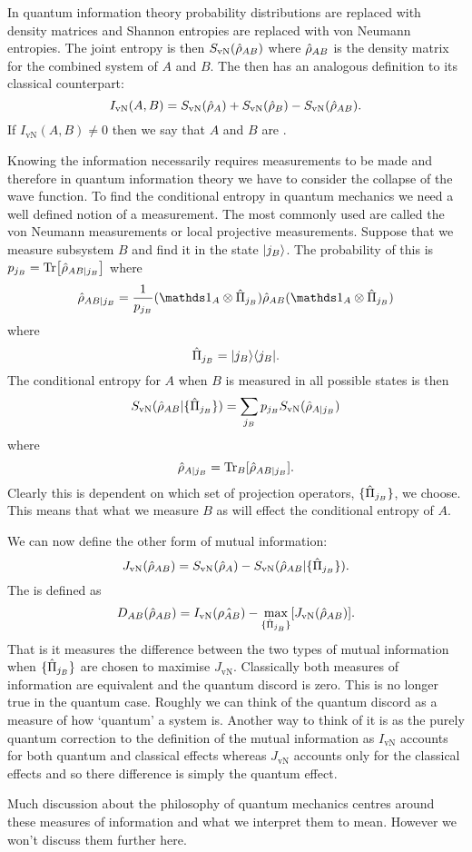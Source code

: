     In quantum information theory probability distributions are replaced with density matrices and Shannon entropies are replaced with von Neumann entropies.
    The joint entropy is then \(S_{\mathrm{vN}}(\hat{\rho}_{AB})\) where \(\hat{\rho}_{AB}\) is the density matrix for the combined system of \(A\) and \(B\).
    The  then has an analogous definition to its classical counterpart:
    \[I_{\mathrm{vN}}(A, B) = S_{\mathrm{vN}}(\hat{\rho}_A) + S_{\mathrm{vN}}(\hat{\rho}_B) - S_{\mathrm{vN}}(\hat{\rho}_{AB}).\]
    If \(I_{\mathrm{vN}}(A, B) \ne 0\) then we say that \(A\) and \(B\) are .
    
    Knowing the information necessarily requires measurements to be made and therefore in quantum information theory we have to consider the collapse of the wave function.
    To find the conditional entropy in quantum mechanics we need a well defined notion of a measurement.
    The most commonly used are called the von Neumann measurements or local projective measurements.
    Suppose that we measure subsystem \(B\) and find it in the state \(\vert {j_B} \rangle\).
    The probability of this is \(p_{j_B} = \Tr[\hat{\rho}_{AB|j_B}]\) where
    \[\operator{\rho}_{AB|j_B} = \frac{1}{p_{j_B}}(\ident_A\tensorProd \operator{\Pi}_{j_B})\operator{\rho}_{AB}(\ident_A\tensorProd\operator{\Pi}_{j_B})\]
    where
    \[\hat{\Pi}_{j_B} = \vert {j_B}\rangle\langle {j_B} \vert.\]
    The conditional entropy for \(A\) when \(B\) is measured in all possible states is then
    \[S_{\mathrm{vN}}(\hat{\rho}_{AB}|\{\hat{\Pi}_{j_B}\}) = \sum_{j_B} p_{j_B}S_{\mathrm{vN}}(\hat{\rho}_{A|j_B})\]
    where
    \[\hat{\rho}_{A|j_B} = \Tr_B[\hat{\rho}_{AB|j_B}].\]
    Clearly this is dependent on which set of projection operators, \(\{\hat{\Pi}_{j_B}\}\), we choose.
    This means that what we measure \(B\) as will effect the conditional entropy of \(A\).
    
    We can now define the other form of mutual information:
    \[J_{\mathrm{vN}}(\hat{\rho}_{AB}) = S_{\mathrm{vN}}(\hat{\rho}_A) - S_{\mathrm{vN}}(\hat{\rho}_{AB}|\{\hat{\Pi}_{j_B}\}).\]
    The  is defined as
    \[D_{AB}(\hat{\rho}_{AB}) = I_{\mathrm{vN}}(\hat{\rho_{AB}}) - \max_{\{\hat{\Pi}_{j_B}\}} [J_{\mathrm{vN}}(\hat{\rho}_{AB})].\]
    That is it measures the difference between the two types of mutual information when \(\{\hat{\Pi}_{j_B}\}\) are chosen to maximise \(J_{\mathrm{vN}}\).
    Classically both measures of information are equivalent and the quantum discord is zero.
    This is no longer true in the quantum case.
    Roughly we can think of the quantum discord as a measure of how `quantum' a system is.
    Another way to think of it is as the purely quantum correction to the definition of the mutual information as \(I_{\mathrm{vN}}\) accounts for both quantum and classical effects whereas \(J_{\mathrm{vN}}\) accounts only for the classical effects and so there difference is simply the quantum effect.
    
    
    Much discussion about the philosophy of quantum mechanics centres around these measures of information and what we interpret them to mean.
    However we won't discuss them further here.